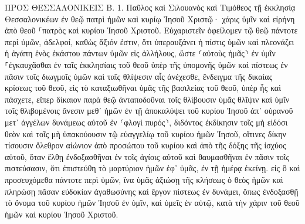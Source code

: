 \documentclass[twoside, 9pt]{extreport}
\begin{document}
ΠΡΟΣ ΘΕΣΣΑΛΟΝΙΚΕΙΣ Β.
1.
Παῦλος καὶ Σιλουανὸς καὶ Τιμόθεος τῇ ἐκκλησίᾳ Θεσσαλονικέων ἐν θεῷ πατρὶ ἡμῶν καὶ κυρίῳ Ἰησοῦ Χριστῷ· 
χάρις ὑμῖν καὶ εἰρήνη ἀπὸ θεοῦ ⸀πατρὸς καὶ κυρίου Ἰησοῦ Χριστοῦ. 
Εὐχαριστεῖν ὀφείλομεν τῷ θεῷ πάντοτε περὶ ὑμῶν, ἀδελφοί, καθὼς ἄξιόν ἐστιν, ὅτι ὑπεραυξάνει ἡ πίστις ὑμῶν καὶ πλεονάζει ἡ ἀγάπη ἑνὸς ἑκάστου πάντων ὑμῶν εἰς ἀλλήλους, 
ὥστε ⸂αὐτοὺς ἡμᾶς⸃ ἐν ὑμῖν ⸀ἐγκαυχᾶσθαι ἐν ταῖς ἐκκλησίαις τοῦ θεοῦ ὑπὲρ τῆς ὑπομονῆς ὑμῶν καὶ πίστεως ἐν πᾶσιν τοῖς διωγμοῖς ὑμῶν καὶ ταῖς θλίψεσιν αἷς ἀνέχεσθε, 
ἔνδειγμα τῆς δικαίας κρίσεως τοῦ θεοῦ, εἰς τὸ καταξιωθῆναι ὑμᾶς τῆς βασιλείας τοῦ θεοῦ, ὑπὲρ ἧς καὶ πάσχετε, 
εἴπερ δίκαιον παρὰ θεῷ ἀνταποδοῦναι τοῖς θλίβουσιν ὑμᾶς θλῖψιν 
καὶ ὑμῖν τοῖς θλιβομένοις ἄνεσιν μεθ᾽ ἡμῶν ἐν τῇ ἀποκαλύψει τοῦ κυρίου Ἰησοῦ ἀπ᾽ οὐρανοῦ μετ᾽ ἀγγέλων δυνάμεως αὐτοῦ 
ἐν ⸂φλογὶ πυρός⸃, διδόντος ἐκδίκησιν τοῖς μὴ εἰδόσι θεὸν καὶ τοῖς μὴ ὑπακούουσιν τῷ εὐαγγελίῳ τοῦ κυρίου ἡμῶν Ἰησοῦ, 
οἵτινες δίκην τίσουσιν ὄλεθρον αἰώνιον ἀπὸ προσώπου τοῦ κυρίου καὶ ἀπὸ τῆς δόξης τῆς ἰσχύος αὐτοῦ, 
ὅταν ἔλθῃ ἐνδοξασθῆναι ἐν τοῖς ἁγίοις αὐτοῦ καὶ θαυμασθῆναι ἐν πᾶσιν τοῖς πιστεύσασιν, ὅτι ἐπιστεύθη τὸ μαρτύριον ἡμῶν ἐφ᾽ ὑμᾶς, ἐν τῇ ἡμέρᾳ ἐκείνῃ. 
εἰς ὃ καὶ προσευχόμεθα πάντοτε περὶ ὑμῶν, ἵνα ὑμᾶς ἀξιώσῃ τῆς κλήσεως ὁ θεὸς ἡμῶν καὶ πληρώσῃ πᾶσαν εὐδοκίαν ἀγαθωσύνης καὶ ἔργον πίστεως ἐν δυνάμει, 
ὅπως ἐνδοξασθῇ τὸ ὄνομα τοῦ κυρίου ἡμῶν Ἰησοῦ ἐν ὑμῖν, καὶ ὑμεῖς ἐν αὐτῷ, κατὰ τὴν χάριν τοῦ θεοῦ ἡμῶν καὶ κυρίου Ἰησοῦ Χριστοῦ. 
\end{document}
